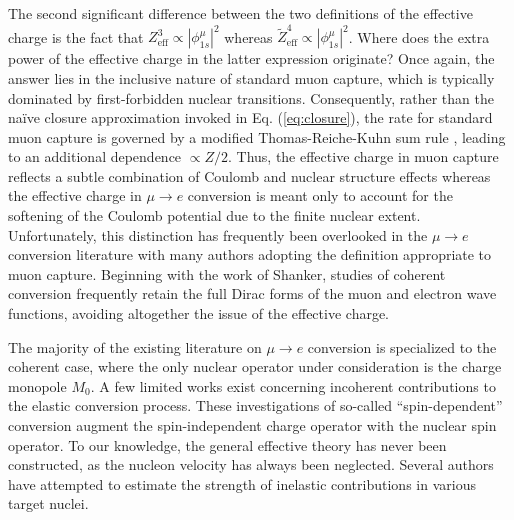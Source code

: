 \documentclass{book}[letterpaper,12pt]
\begin{document}
The second significant difference between the two definitions of the effective charge is the fact that $Z_\mathrm{eff}^3\propto |\phi_{1s}^{\mu}|^2$ whereas $\tilde{Z}_\mathrm{eff}^4\propto |\phi_{1s}^{\mu}|^2$. Where does the extra power of the effective charge in the latter expression originate? Once again, the answer lies in the inclusive nature of standard muon capture, which is typically dominated by first-forbidden nuclear transitions. Consequently, rather than the na\"ive closure approximation invoked in Eq. (\ref{eq:closure}), the rate for standard muon capture is governed by a modified Thomas-Reiche-Kuhn sum rule \cite{DoDang:1972pc}, leading to an additional dependence $\propto Z/2$. Thus, the effective charge in muon capture reflects a subtle combination of Coulomb and nuclear structure effects whereas the effective charge in $\mu\rightarrow e$ conversion is meant only to account for the softening of the Coulomb potential due to the finite nuclear extent. Unfortunately, this distinction has frequently been overlooked in the $\mu\rightarrow e$ conversion literature with many authors adopting the definition appropriate to muon capture. Beginning with the work of Shanker, studies of coherent conversion frequently retain the full Dirac forms of the muon and electron wave functions, avoiding altogether the issue of the effective charge.

The majority of the existing literature on $\mu\rightarrow e$ conversion is specialized to the coherent case, where the only nuclear operator under consideration is the charge monopole $M_0$. A few limited works exist concerning incoherent contributions to the elastic conversion process. These investigations of so-called ``spin-dependent'' conversion augment the spin-independent charge operator with the nuclear spin operator. To our knowledge, the general effective theory has never been constructed, as the nucleon velocity has always been neglected. Several authors have attempted to estimate the strength of inelastic contributions in various target nuclei.
\end{document}
